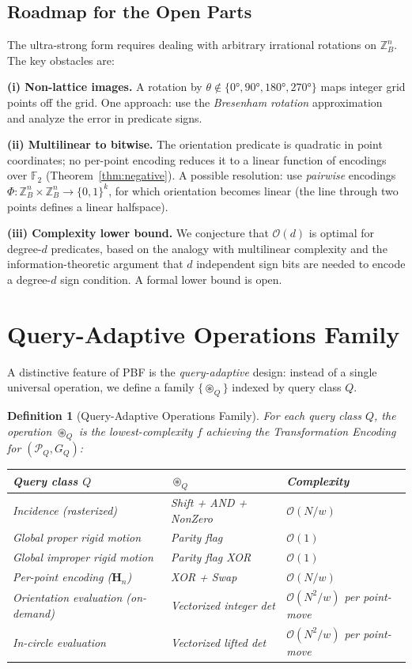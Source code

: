\documentclass[11pt,letterpaper]{article}
\newtheorem{definition}[theorem]{Definition}
\newcommand{\ZBd}[1]{\mathbb{Z}_B^{#1}}
\newcommand{\Hn}{\mathbf{H}_n}
\newcommand{\cP}{\mathcal{P}}
\newcommand{\cO}{\mathcal{O}}
\newcommand{\oast}{\circledast}
\newcommand{\wt}{w}       %
\begin{document}
\subsection{Roadmap for the Open Parts}

The ultra-strong form requires dealing with arbitrary irrational rotations on $\ZBd{n}$.
The key obstacles are:

\textbf{(i) Non-lattice images.}  A rotation by $\theta\notin\{0°,90°,180°,270°\}$ maps
integer grid points off the grid.  One approach: use the \emph{Bresenham rotation}
approximation~\cite{Bresenham65} and analyze the error in predicate signs.

\textbf{(ii) Multilinear to bitwise.}  The orientation predicate is quadratic in point
coordinates; no per-point encoding reduces it to a linear function of encodings over
$\mathbb{F}_2$ (Theorem~\ref{thm:negative}).  A possible resolution: use
\emph{pairwise} encodings $\Phi:\ZBd{n}\times\ZBd{n}\to\{0,1\}^k$, for which orientation
becomes linear (the line through two points defines a linear halfspace).

\textbf{(iii) Complexity lower bound.}  We conjecture that $\cO(d)$ is optimal for
degree-$d$ predicates, based on the analogy with multilinear complexity and the
information-theoretic argument that $d$ independent sign bits are needed to encode a
degree-$d$ sign condition.  A formal lower bound is open.

\section{Query-Adaptive Operations Family}\label{sec:query_adaptive}

A distinctive feature of PBF is the \emph{query-adaptive} design: instead of a single
universal operation, we define a family $\{\oast_Q\}$ indexed by query class $Q$.

\begin{definition}[Query-Adaptive Operations Family]\label{def:qaf}
For each query class $Q$, the operation $\oast_Q$ is the lowest-complexity $f$ achieving
the Transformation Encoding for $(\cP_Q, G_Q)$:
\begin{center}
\begin{tabular}{lll}
\toprule
Query class $Q$ & $\oast_Q$ & Complexity \\
\midrule
Incidence (rasterized) & Shift + AND + NonZero & $\cO(N/\wt)$ \\
Global proper rigid motion & Parity flag & $\cO(1)$ \\
Global improper rigid motion & Parity flag XOR & $\cO(1)$ \\
Per-point encoding ($\Hn$) & XOR + Swap & $\cO(N/\wt)$ \\
Orientation evaluation (on-demand) & Vectorized integer det & $\cO(N^2/\wt)$ per point-move \\
In-circle evaluation & Vectorized lifted det & $\cO(N^2/\wt)$ per point-move \\
\bottomrule
\end{tabular}
\end{center}
\end{definition}
\end{document}
